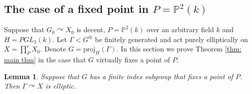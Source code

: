 \documentclass[12pt]{article}
\newtheorem{lem}[thm]{Lemma}
\theoremstyle{definition}
\begin{document}

\subsection{The case of a fixed point in $P = \mathbb{P}^2(k)$}

\label{section: fixed subspace}

Suppose that $G_0 \curvearrowright X_0$ is decent, $P = \mathbb{P}^2(k)$ over an arbitrary field $k$ and $H = PGL_3(k)$. Let $\Gamma < G^{\oplus}$ be finitely generated and act purely elliptically on $X = \prod^r_P X_0$. Denote $G = \mathrm{proj}_H(\Gamma)$. In this section we prove Theorem \ref{thm: main thm} in the case that $G$ virtually fixes a point of $P$. 

\begin{lem}
    \label{lem: virtual fixed point on P implies elliptic}
    Suppose that $G$ has a finite index subgroup that fixes a point of $P$. Then $\Gamma \curvearrowright X$ is elliptic. 
\end{lem}
\end{document}

